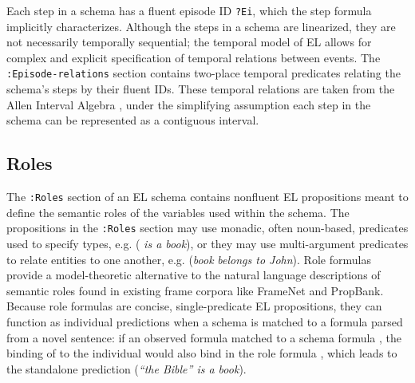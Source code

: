 Each step in a schema has a fluent episode ID \texttt{?Ei}, which the step formula implicitly characterizes.
Although the steps in a schema are linearized, they are not necessarily temporally sequential; the temporal model of EL allows for complex and explicit specification of temporal relations between events.
The \texttt{:Episode-relations} section contains two-place temporal predicates relating the schema's steps by their fluent IDs.
These temporal relations are taken from the Allen Interval Algebra \citep{allen1983maintaining}, under the simplifying assumption each step in the schema can be represented as a contiguous interval.


\subsection{Roles}
\label{sec:roles}
The \texttt{:Roles} section of an EL schema contains nonfluent EL propositions meant to define the semantic roles of the variables used within the schema.
The propositions in the \texttt{:Roles} section may use monadic, often noun-based, predicates used to specify types, e.g.  ( \textit{is a book}), or they may use multi-argument predicates to relate entities to one another, e.g.  (\textit{book}  \textit{belongs to John}).
Role formulas provide a model-theoretic alternative to the natural language descriptions of semantic roles found in existing frame corpora like FrameNet and PropBank.
Because role formulas are concise, single-predicate EL propositions, they can function as individual predictions when a schema is matched to a formula parsed from a novel sentence: if an observed formula  matched to a schema formula , the binding of  to the individual  would also bind  in the role formula , which leads to the standalone prediction  (\textit{``the Bible'' is a book}).

